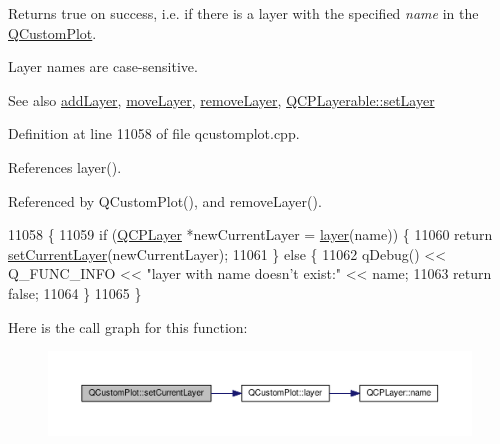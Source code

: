 Returns true on success, i.\+e. if there is a layer with the specified {\itshape name} in the \hyperlink{class_q_custom_plot}{Q\+Custom\+Plot}.

Layer names are case-\/sensitive.

\begin{DoxySeeAlso}{See also}
\hyperlink{class_q_custom_plot_ad5255393df078448bb6ac83fa5db5f52}{add\+Layer}, \hyperlink{class_q_custom_plot_ae896140beff19424e9e9e02d6e331104}{move\+Layer}, \hyperlink{class_q_custom_plot_a40f75e342c5eaab6a86066a42a0e2a94}{remove\+Layer}, \hyperlink{class_q_c_p_layerable_ab0d0da6d2de45a118886d2c8e16d5a54}{Q\+C\+P\+Layerable\+::set\+Layer} 
\end{DoxySeeAlso}


Definition at line 11058 of file qcustomplot.\+cpp.



References layer().



Referenced by Q\+Custom\+Plot(), and remove\+Layer().


\begin{DoxyCode}
11058                                                      \{
11059   \textcolor{keywordflow}{if} (\hyperlink{class_q_c_p_layer}{QCPLayer} *newCurrentLayer = \hyperlink{class_q_custom_plot_aac492da01782820454e9136a8db28182}{layer}(name)) \{
11060     \textcolor{keywordflow}{return} \hyperlink{class_q_custom_plot_a73a6dc47c653bb6f8f030abca5a11852}{setCurrentLayer}(newCurrentLayer);
11061   \} \textcolor{keywordflow}{else} \{
11062     qDebug() << Q\_FUNC\_INFO << \textcolor{stringliteral}{"layer with name doesn't exist:"} << name;
11063     \textcolor{keywordflow}{return} \textcolor{keyword}{false};
11064   \}
11065 \}
\end{DoxyCode}


Here is the call graph for this function\+:\nopagebreak
\begin{figure}[H]
\begin{center}
\leavevmode
\includegraphics[width=350pt]{class_q_custom_plot_a73a6dc47c653bb6f8f030abca5a11852_cgraph}
\end{center}
\end{figure}




